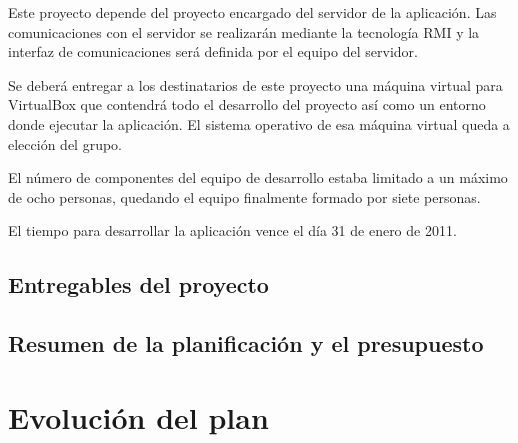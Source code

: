 Este proyecto depende del proyecto encargado del servidor de la aplicación. Las
comunicaciones con el servidor se realizarán mediante la tecnología RMI y la
interfaz de comunicaciones será definida por el equipo del servidor.

Se deberá entregar a los destinatarios de este proyecto una máquina virtual
para VirtualBox que contendrá todo el desarrollo del proyecto así como un
entorno donde ejecutar la aplicación. El sistema operativo de esa máquina
virtual queda a elección del grupo.

El número de componentes del equipo de desarrollo estaba limitado a un máximo
de ocho personas, quedando el equipo finalmente formado por siete personas.

El tiempo para desarrollar la aplicación vence el día 31 de enero de 2011.

\subsection{Entregables del proyecto}

\subsection{Resumen de la planificación y el presupuesto}

\section{Evolución del plan}
